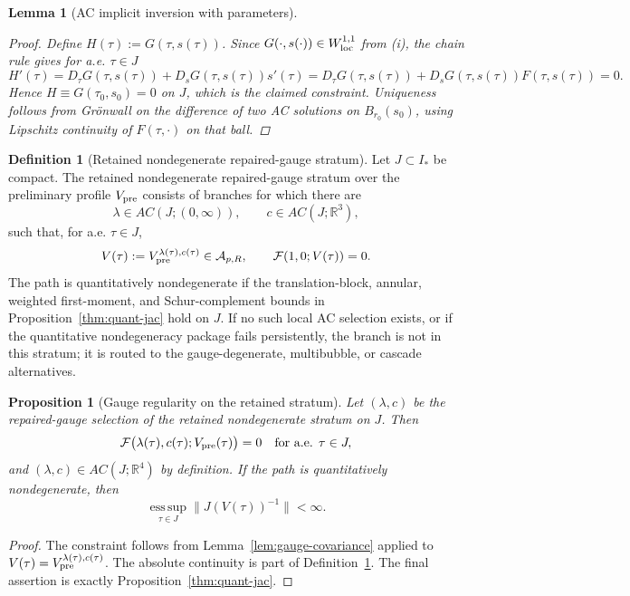 \documentclass[11pt]{amsart}
\theoremstyle{plain}
\newtheorem{lemma}[theorem]{Lemma}
\newtheorem{proposition}[theorem]{Proposition}
\theoremstyle{definition}
\newtheorem{definition}[theorem]{Definition}
\theoremstyle{remark}
\begin{document}
\begin{lemma}[AC implicit inversion with parameters]
\begin{proof}
Define \(H(\tau):=G(\tau,s(\tau))\). Since \(G(\cdot,s(\cdot))\in W^{1,1}_{\rm loc}\) from (i),
the chain rule gives for a.e. \(\tau\in J\)
\[
H'(\tau)=D_\tau G(\tau,s(\tau))+D_sG(\tau,s(\tau))s'(\tau)
=D_\tau G(\tau,s(\tau))+D_sG(\tau,s(\tau))F(\tau,s(\tau))=0.
\]
Hence \(H\equiv G(\tau_0,s_0)=0\) on \(J\), which is the claimed constraint.
Uniqueness follows from Grönwall on the difference of two AC solutions on \(B_{r_0}(s_0)\),
using Lipschitz continuity of \(F(\tau,\cdot)\) on that ball.
\end{proof}
\end{lemma}

\begin{definition}[Retained nondegenerate repaired-gauge stratum]\label{def:admissible-gauge-path}
Let \(J\subset I_*\) be compact. The retained nondegenerate repaired-gauge
stratum over the preliminary profile \(V_{\rm pre}\) consists of branches for
which there are
\[
\lambda\in AC(J;(0,\infty)),\qquad c\in AC(J;\mathbb R^3),
\]
such that, for a.e. \(\tau\in J\),
\[
V(\tau):=V_{\rm pre}^{\lambda(\tau),c(\tau)}\in\mathcal A_{p,R},\qquad
\mathcal F(1,0;V(\tau))=0.
\]
The path is quantitatively nondegenerate if the translation-block, annular,
weighted first-moment, and Schur-complement bounds in
Proposition~\ref{thm:quant-jac} hold on \(J\).
If no such local AC selection exists, or if the quantitative nondegeneracy
package fails persistently, the branch is not in this stratum; it is routed to
the gauge-degenerate, multibubble, or cascade alternatives.
\end{definition}

\begin{proposition}[Gauge regularity on the retained stratum]\label{prop:preliminary-correction}
Let \((\lambda,c)\) be the repaired-gauge selection of the retained
nondegenerate stratum on \(J\). Then
\[
\mathcal F\bigl(\lambda(\tau),c(\tau);V_{\rm pre}(\tau)\bigr)=0
\quad\text{for a.e. }\tau\in J,
\]
and \((\lambda,c)\in AC(J;\mathbb R^4)\) by definition. If the path is
quantitatively nondegenerate, then
\[
\operatorname*{ess\,sup}_{\tau\in J}\|J(V(\tau))^{-1}\|<\infty.
\]
\end{proposition}
\begin{proof}
The constraint follows from Lemma~\ref{lem:gauge-covariance} applied to
\(V(\tau)=V_{\rm pre}^{\lambda(\tau),c(\tau)}\). The absolute continuity is part
of Definition~\ref{def:admissible-gauge-path}. The final assertion is exactly
Proposition~\ref{thm:quant-jac}.
\end{proof}
\end{document}
